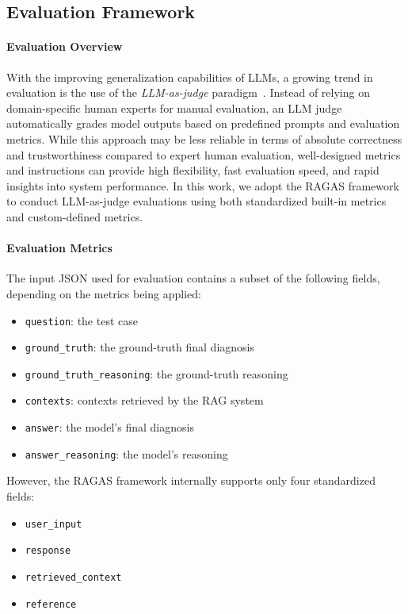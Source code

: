 \subsection{Evaluation Framework}
\label{sec:evaluation}

\paragraph{Evaluation Overview}

With the improving generalization capabilities of \ac{LLM}s, a growing trend in evaluation is the use of the \emph{LLM-as-judge} paradigm~\cite{llmasjudge}. Instead of relying on domain-specific human experts for manual evaluation, an LLM judge automatically grades model outputs based on predefined prompts and evaluation metrics. While this approach may be less reliable in terms of absolute correctness and trustworthiness compared to expert human evaluation, well-designed metrics and instructions can provide high flexibility, fast evaluation speed, and rapid insights into system performance. In this work, we adopt the RAGAS framework to conduct LLM-as-judge evaluations using both standardized built-in metrics and custom-defined metrics.

\paragraph{Evaluation Metrics}

The input JSON used for evaluation contains a subset of the following fields, depending on the metrics being applied:
\begin{itemize}
  \item \texttt{question}: the test case
  \item \texttt{ground\_truth}: the ground-truth final diagnosis
  \item \texttt{ground\_truth\_reasoning}: the ground-truth reasoning
  \item \texttt{contexts}: contexts retrieved by the \ac{RAG} system
  \item \texttt{answer}: the model’s final diagnosis
  \item \texttt{answer\_reasoning}: the model’s reasoning
\end{itemize}

However, the RAGAS framework internally supports only four standardized fields:
\begin{itemize}
  \item \texttt{user\_input}
  \item \texttt{response}
  \item \texttt{retrieved\_context}
  \item \texttt{reference}
\end{itemize}

